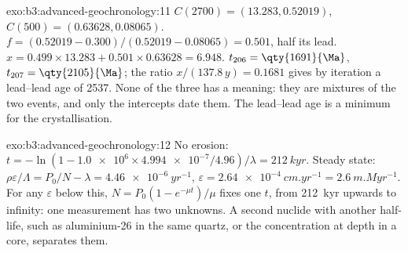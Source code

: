 \begin{solution}{exo:b3:advanced-geochronology:11}
$C(2700) = (13.283, 0.52019)$, $C(500) = (0.63628, 0.08065)$. $f = (0.52019 -
0.300)/(0.52019 - 0.08065) = 0.501$, half its lead. $x = 0.499\times13.283 +
0.501\times0.63628 = 6.948$. $t_{206} = \qty{1691}{\Ma}$, $t_{207} =
\qty{2105}{\Ma}$; the ratio $x/(137.8\,y) = 0.1681$ gives by iteration a
lead--lead age of \qty{2537}{\Ma}. None of the three has a meaning: they are
mixtures of the two events, and only the intercepts date them. The lead--lead
age is a minimum for the crystallisation.
\end{solution}

\begin{solution}{exo:b3:advanced-geochronology:12}
No erosion: $t = -\ln(1 - \num{1.0e6}\times\num{4.994e-7}/4.96)/\lambda =
\qty{212}{kyr}$. Steady state: $\rho\varepsilon/\Lambda = P_0/N - \lambda =
\qty{4.46e-6}{yr^{-1}}$, $\varepsilon = \qty{2.64e-4}{cm.yr^{-1}} =
\qty{2.6}{m.Myr^{-1}}$. For any $\varepsilon$ below this, $N =
P_0(1 - e^{-\mu t})/\mu$ fixes one $t$, from \qty{212}{kyr} upwards to
infinity: one measurement has two unknowns. A second nuclide with another
half-life, such as aluminium-26 in the same quartz, or the concentration at
depth in a core, separates them.
\end{solution}

